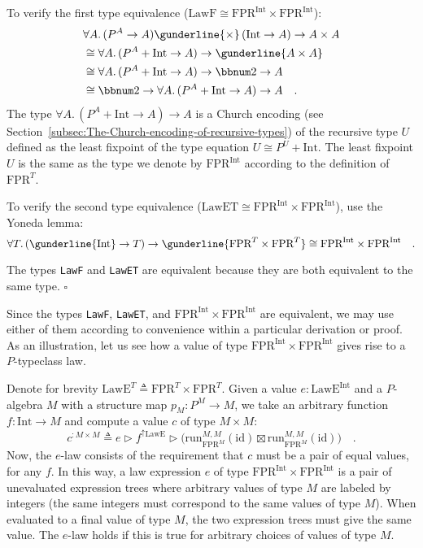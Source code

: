 To verify the first type equivalence ($\text{LawF}\cong\text{FPR}^{\text{Int}}\times\text{FPR}^{\text{Int}}$):
\begin{align*}
 & \forall A.\,(P^{A}\rightarrow A)\gunderline{\times}\,(\text{Int}\rightarrow A)\rightarrow A\times A\\
 & \cong\forall A.\,(P^{A}+\text{Int}\rightarrow A)\rightarrow\gunderline{A\times A}\\
 & \cong\forall A.\,(P^{A}+\text{Int}\rightarrow A)\rightarrow\bbnum 2\rightarrow A\\
 & \cong\bbnum 2\rightarrow\forall A.\,(P^{A}+\text{Int}\rightarrow A)\rightarrow A\quad.
\end{align*}
The type $\forall A.\,(P^{A}+\text{Int}\rightarrow A)\rightarrow A$
is a Church encoding (see Section~\ref{subsec:The-Church-encoding-of-recursive-types})
of the recursive type $U$ defined as the least fixpoint of the type
equation $U\cong P^{U}+\text{Int}$. The least fixpoint $U$ is the
same as the type we denote by $\text{FPR}^{\text{Int}}$ according
to the definition of $\text{FPR}^{T}$.

To verify the second type equivalence ($\text{LawET}\cong\text{FPR}^{\text{Int}}\times\text{FPR}^{\text{Int}}$),
use the Yoneda lemma:
\[
\forall T.\,(\gunderline{\text{Int}}\rightarrow T)\rightarrow\gunderline{\text{FPR}^{T}\times\text{FPR}^{T}}\cong\text{FPR}^{\text{Int}}\times\text{FPR}^{\text{Int}}\quad.
\]
\vspace{-1\baselineskip}

The types \lstinline!LawF!
and \lstinline!LawET! are
equivalent because they are both equivalent to the same type. $\square$

Since the types \lstinline!LawF!,
\lstinline!LawET!, and
$\text{FPR}^{\text{Int}}\times\text{FPR}^{\text{Int}}$ are equivalent,
we may use either of them according to convenience within a particular
derivation or proof. As an illustration, let us see how a value of
type $\text{FPR}^{\text{Int}}\times\text{FPR}^{\text{Int}}$ gives
rise to a $P$-typeclass law.

Denote for brevity $\text{LawE}^{T}\triangleq\text{FPR}^{T}\times\text{FPR}^{T}$.
Given a value $e:\text{LawE}^{\text{Int}}$ and a $P$-algebra $M$
with a structure map $p_{M}:P^{M}\rightarrow M$, we take an arbitrary
function $f:\text{Int}\rightarrow M$ and compute a value $c$ of
type $M\times M$:
\[
c^{:M\times M}\triangleq e\triangleright f^{\uparrow\text{LawE}}\triangleright\big(\text{run}_{\text{FPR}^{M}}^{M,M}(\text{id})\boxtimes\text{run}_{\text{FPR}^{M}}^{M,M}(\text{id})\big)\quad.
\]
Now, the $e$-law consists of the requirement that $c$ must be a
pair of equal values, for any $f$. In this way, a law expression
$e$ of type $\text{FPR}^{\text{Int}}\times\text{FPR}^{\text{Int}}$
is a pair of unevaluated expression trees where arbitrary values of
type $M$ are labeled by integers (the same integers must correspond
to the same values of type $M$). When evaluated to a final value
of type $M$, the two expression trees must give the same value. The
$e$-law holds if this is true for arbitrary choices of values of
type $M$.


